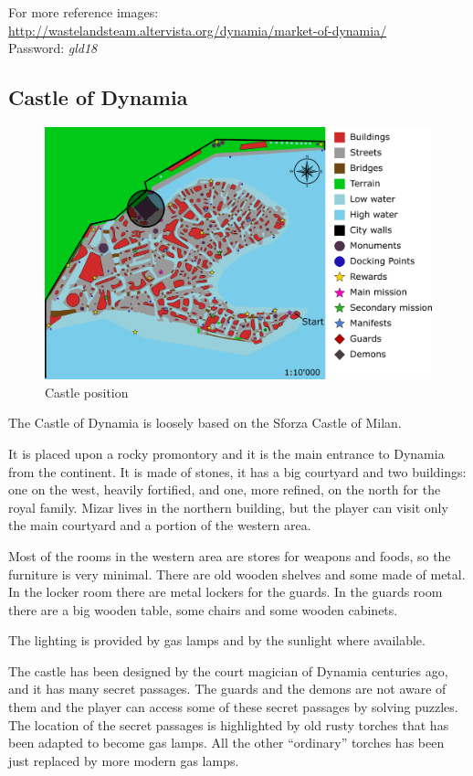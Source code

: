 For more reference images: \url{http://wastelandsteam.altervista.org/dynamia/market-of-dynamia/}\\
Password: \textit{gld18}

\subsection{Castle of Dynamia}
\begin{figure}[H]
  \centering
  \includegraphics[width=\textwidth]{Images/Maps/dynamia_castleOfDynamia}
  \caption{Castle position}
\end{figure}

The Castle of Dynamia is loosely based on the Sforza Castle of Milan.

It is placed upon a rocky promontory and it is the main entrance to Dynamia from the continent. It is made of stones, it has a big courtyard and two buildings: one on the west, heavily fortified, and one, more refined, on the north for the royal family. Mizar lives in the northern building, but the player can visit only the main courtyard and a portion of the western area.

Most of the rooms in the western area are stores for weapons and foods, so the furniture is very minimal. There are old wooden shelves and some made of metal. In the locker room there are metal lockers for the guards. In the guards room there are a big wooden table, some chairs and some wooden cabinets.

The lighting is provided by gas lamps and by the sunlight where available.

The castle has been designed by the court magician of Dynamia centuries ago, and it has many secret passages. The guards and the demons are not aware of them and the player can access some of these secret passages by solving puzzles. The location of the secret passages is highlighted by old rusty torches that has been adapted to become gas lamps. All the other \enquote{ordinary} torches has been just replaced by more modern gas lamps.

